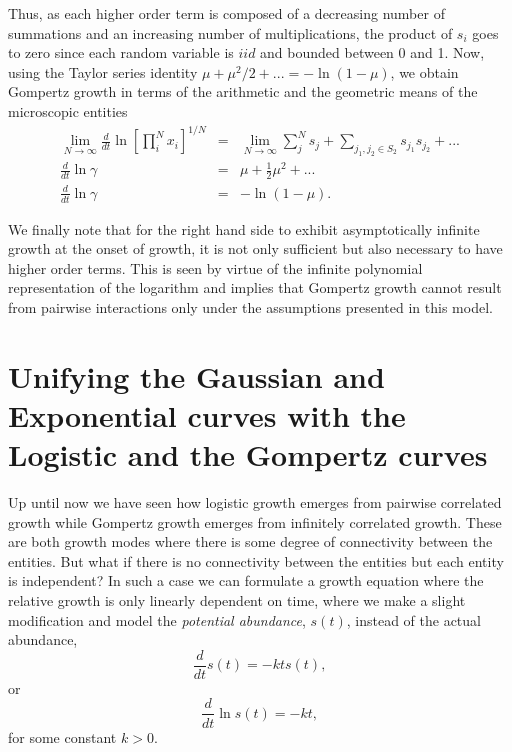 \documentclass{article}
\begin{document}
Thus, as each higher order term is composed of a decreasing number of summations and an increasing number of multiplications, the product of $s_i$ goes to zero since each random variable is $iid$ and bounded between 0 and 1. 
Now, using the Taylor series identity $\mu+\mu^2/2+... = -\ln(1-\mu)$, we obtain Gompertz growth in terms of the arithmetic and the geometric means of the microscopic entities
\begin{eqnarray*}
\label{eq:MicroGomp13}
\lim_{N\rightarrow \infty}\frac{d}{dt} \ln \left[ \prod_i^N x_i \right ]^{1/N} &=&  \lim_{N\rightarrow \infty}\sum_j^N s_{j} + \sum_{j_1, j_2 \in S_2} s_{j_1}s_{j_2} + ...\\
\frac{d}{dt} \ln \gamma &=&  \mu + \frac{1}{2} \mu^2 + ...\\
\frac{d}{dt} \ln \gamma &=& - \ln (1-\mu).
\end{eqnarray*}

We finally note that for the right hand side to exhibit asymptotically infinite growth at the onset of growth, it is not only sufficient but also necessary to have higher order terms. This is seen by virtue of the infinite polynomial representation of the logarithm and implies that Gompertz growth cannot result from pairwise interactions only under the assumptions presented in this model.

\section{Unifying the Gaussian and Exponential curves with the Logistic and the Gompertz curves}

Up until now we have seen how logistic growth emerges from pairwise correlated growth while Gompertz growth emerges from infinitely correlated growth. These are both growth modes where there is some degree of connectivity between the entities. But what if there is no connectivity between the entities but each entity is independent? In such a case we can formulate a growth equation where the relative growth is only linearly dependent on time, where we make a slight modification and model the \textit{potential abundance}, $s(t)$, instead of the actual abundance,
\begin{equation}
  \frac{d}{dt}s(t) = - k t s(t),
\end{equation}
or 
\begin{equation}
  \frac{d}{dt}\ln s(t) = - k t,
\end{equation}
for some constant $k>0$. 
 
\end{document}
